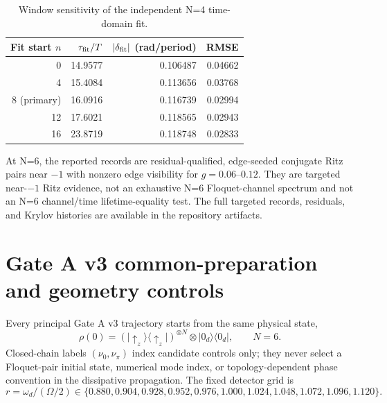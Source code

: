 \documentclass[11pt]{article}
\newcommand{\ket}[1]{\lvert #1\rangle}
\newcommand{\bra}[1]{\langle #1\rvert}
\begin{document}
\begin{table}[ht]
\centering
\caption{Window sensitivity of the independent N=4 time-domain fit.}
\label{tab:supp-window}
\begin{tabular}{rrrr}
\toprule
Fit start $n$ & $\tau_{\rm fit}/T$ & $|\delta_{\rm fit}|$ (rad/period) & RMSE \\
\midrule
0 & 14.9577 & 0.106487 & 0.04662 \\
4 & 15.4084 & 0.113656 & 0.03768 \\
8 (primary) & 16.0916 & 0.116739 & 0.02994 \\
12 & 17.6021 & 0.118565 & 0.02943 \\
16 & 23.8719 & 0.118748 & 0.02833 \\
\bottomrule
\end{tabular}
\end{table}

At N=6, the reported records are residual-qualified, edge-seeded conjugate Ritz pairs near $-1$ with nonzero edge visibility for $g=0.06$--$0.12$. They are targeted near-$-1$ Ritz evidence, not an exhaustive N=6 Floquet-channel spectrum and not an N=6 channel/time lifetime-equality test. The full targeted records, residuals, and Krylov histories are available in the repository artifacts.

\section{Gate A v3 common-preparation and geometry controls}
\label{sec:supp-gatea}

Every principal Gate A v3 trajectory starts from the same physical state,
\begin{equation}
\rho(0)=\left(\ket{\uparrow_z}\bra{\uparrow_z}\right)^{\otimes N}\otimes\ket{0_d}\bra{0_d},\qquad N=6.
\end{equation}
Closed-chain labels $(\nu_0,\nu_\pi)$ index candidate controls only; they never select a Floquet-pair initial state, numerical mode index, or topology-dependent phase convention in the dissipative propagation. The fixed detector grid is
\begin{equation}
r=\omega_d/(\Omega/2)\in\{0.880,0.904,0.928,0.952,0.976,1.000,1.024,1.048,1.072,1.096,1.120\}.
\end{equation}
\end{document}
